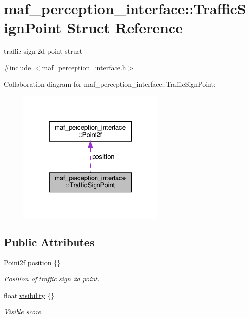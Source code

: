 \hypertarget{structmaf__perception__interface_1_1TrafficSignPoint}{}\section{maf\+\_\+perception\+\_\+interface\+:\+:Traffic\+Sign\+Point Struct Reference}
\label{structmaf__perception__interface_1_1TrafficSignPoint}


traffic sign 2d point struct  




{\ttfamily \#include $<$maf\+\_\+perception\+\_\+interface.\+h$>$}



Collaboration diagram for maf\+\_\+perception\+\_\+interface\+:\+:Traffic\+Sign\+Point\+:\nopagebreak
\begin{figure}[H]
\begin{center}
\leavevmode
\includegraphics[width=206pt]{structmaf__perception__interface_1_1TrafficSignPoint__coll__graph}
\end{center}
\end{figure}
\subsection*{Public Attributes}
\begin{DoxyCompactItemize}
\item 
\hyperlink{structmaf__perception__interface_1_1Point2f}{Point2f} \hyperlink{structmaf__perception__interface_1_1TrafficSignPoint_acf0279af8f83d1fbd2e3bbb95543762e}{position} \{\}
\begin{DoxyCompactList}\small\item\em Position of traffic sign 2d point. \end{DoxyCompactList}\item 
float \hyperlink{structmaf__perception__interface_1_1TrafficSignPoint_acc21fb7653e37d6a92d9748b4efb71ff}{visibility} \{\}
\begin{DoxyCompactList}\small\item\em Visible score. \end{DoxyCompactList}\end{DoxyCompactItemize}


